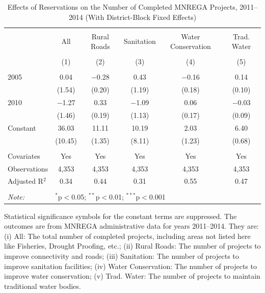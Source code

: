 \begin{table}[!htbp]
\centering
\begin{threeparttable}

  \caption{Effects of Reservations on the Number of Completed MNREGA Projects, 2011--2014 (With District-Block Fixed Effects)} 
  \label{main_mnrega_fe} 
\scriptsize 
\begin{tabular}{@{\extracolsep{0pt}}lccccc} 
\\[-1.8ex]\hline 
\hline \\[-1.8ex] 
 & All & Rural Roads & Sanitation & Water Conservation & Trad. Water \\ 
\\[-1.8ex] & (1) & (2) & (3) & (4) & (5)\\ 
\hline \\[-1.8ex] 
 2005 & 0.04 & $-$0.28 & 0.43 & $-$0.16 & 0.14 \\ 
  & (1.54) & (0.20) & (1.19) & (0.18) & (0.10) \\ 
  2010 & $-$1.27 & 0.33 & $-$1.09 & 0.06 & $-$0.03 \\ 
  & (1.46) & (0.19) & (1.13) & (0.17) & (0.09) \\ 
  Constant & 36.03 & 11.11 & 10.19 & 2.03 & 6.40 \\ 
  & (10.45) & (1.35) & (8.11) & (1.23) & (0.68) \\ 
 \hline \\[-1.8ex] 
Covariates & Yes & Yes & Yes & Yes & Yes \\ 
Observations & 4,353 & 4,353 & 4,353 & 4,353 & 4,353 \\ 
Adjusted R$^{2}$ & 0.34 & 0.44 & 0.31 & 0.55 & 0.47 \\ 
\hline 
\hline \\[-1.8ex] 
\textit{Note:}  & \multicolumn{5}{l}{$^{*}$p$<$0.05; $^{**}$p$<$0.01; $^{***}$p$<$0.001} \\ 
\end{tabular} 
\begin{tablenotes}[flushleft]
\scriptsize
\item[] Statistical significance symbols for the constant terms are suppressed. The outcomes are from MNREGA administrative data for years 2011--2014. They are: 
(i) All: The total number of completed projects, including areas not listed here like Fisheries, Drought Proofing, etc.;
(ii) Rural Roads: The number of projects to improve connectivity and roads;
(iii) Sanitation: The number of projects to improve sanitation facilities;
(iv) Water Conservation: The number of projects to improve water conservation;
(v) Trad. Water: The number of projects to maintain traditional water bodies.
\end{tablenotes}
\end{threeparttable}
\end{table}
